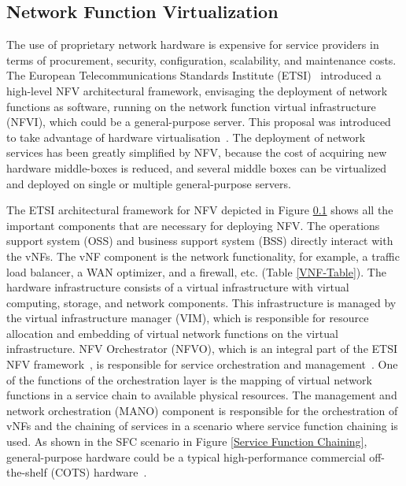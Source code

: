 \documentclass[futureinternet,review,accept,pdftex,moreauthors]{Definitions/mdpi}
\begin{document}




\subsection{Network Function Virtualization}
\label{NFV}
The use of proprietary network hardware is expensive for service providers in terms of procurement, security, configuration, scalability, and maintenance costs. The European Telecommunications Standards Institute (ETSI)~\cite{etsi2013network} introduced a high-level NFV architectural framework, envisaging the deployment of network functions as software, running on the network function virtual infrastructure (NFVI), which could be a general-purpose server. This proposal was introduced to take advantage of hardware virtualisation~\cite{binu2011virtualization,wray2012network}. The deployment of network services has been greatly simplified by NFV, because the cost of acquiring new hardware middle-boxes is reduced, and several middle boxes can be virtualized and deployed on single or multiple general-purpose servers.


The ETSI architectural framework for NFV depicted in Figure \ref{NFV} shows all the important components that are necessary for deploying NFV. The operations support system (OSS) and business support system (BSS) directly interact with the vNFs. The vNF component is the network functionality, for example, a traffic load balancer, a WAN optimizer, and a firewall, etc. (Table \ref{VNF-Table}). The hardware infrastructure consists of a virtual infrastructure with virtual computing, storage, and network components. This infrastructure is managed by the virtual infrastructure manager (VIM), which is responsible for resource allocation and embedding of virtual network functions on the virtual infrastructure. NFV Orchestrator (NFVO), which is an integral part of the ETSI NFV framework~\cite{etsi2013network}, is responsible for service orchestration and management~\cite{medhat2016service}. One of the functions of the orchestration layer is the mapping of virtual network functions in a service chain to available physical resources. The management and network orchestration (MANO) component is responsible for the orchestration of vNFs and the chaining of services in a scenario where service function chaining is used. As shown in the SFC scenario in Figure \ref{Service Function Chaining}, general-purpose hardware could be a typical high-performance commercial off-the-shelf (COTS) hardware~\cite{etsi2013network}.
\end{document}

